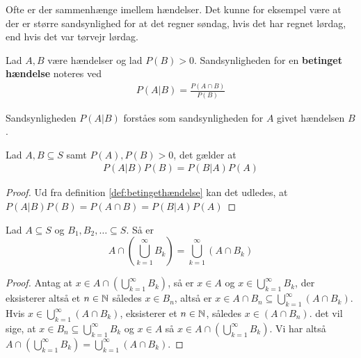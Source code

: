 Ofte er der sammenhænge imellem hændelser. Det kunne for eksempel være at der er større sandsynlighed for at det regner søndag, hvis det har regnet lørdag, end hvis det var tørvejr lørdag.
\begin{defn}\label{def:betingethændelse} %
Lad $A, B$ være hændelser og lad $P(B)>0$. Sandsynligheden for en \textbf{betinget hændelse} noteres ved
\begin{align*}
    P(A|B)=\frac{P(A\cap B)}{P(B)}
\end{align*}
\end{defn}
Sandsynligheden $P(A|B)$ forståes som sandsynligheden for $A$ givet hændelsen $B$.

 
\begin{thm}\label{thm:bayesTheorem} %
Lad $A, B \subseteq S$ samt $P(A), P(B) > 0$, det gælder at
\begin{align*}
    P(A|B)P(B)=P(B|A)P(A)
\end{align*}
\end{thm}
\begin{proof}
Ud fra definition \ref{def:betingethændelse} kan det udledes, at $P(A|B)P(B)=P(A\cap B)=P(B|A)P(A)$
\end{proof}

\begin{lem}  \label{lem:DistributiveLawForInfiniteUnions}
Lad $A \subseteq S$ og $B_1, B_2, \ldots \subseteq S$. Så er 
\begin{equation*}
    A \cap \left( \bigcup^\infty_{k = 1} B_k \right) = \bigcup^\infty_{k = 1} (A \cap B_k)
\end{equation*}
\end{lem}
\begin{proof}
Antag at $x \in A \cap \left( \bigcup^\infty_{k = 1} B_k\right)$, så er $x \in A$ og $x \in \bigcup^\infty_{k = 1} B_k$, der eksisterer altså et $n \in \mathbb{N}$ således $x \in B_n$, altså er $x \in A \cap B_n \subseteq \bigcup^\infty_{k = 1} (A \cap B_k)$. 
Hvis $x \in \bigcup^\infty_{k = 1} (A \cap B_k)$, eksisterer et $n \in \mathbb{N}$, således $x \in (A \cap B_n)$. det vil sige, at $x \in B_n \subseteq \bigcup^\infty_{k = 1} B_k$ og $x \in A$ så $x \in A \cap \left( \bigcup^\infty_{k = 1} B_k \right)$. Vi har altså $A \cap \left( \bigcup^\infty_{k = 1} B_k \right) = \bigcup^\infty_{k = 1} (A \cap B_k)$.
\end{proof}

